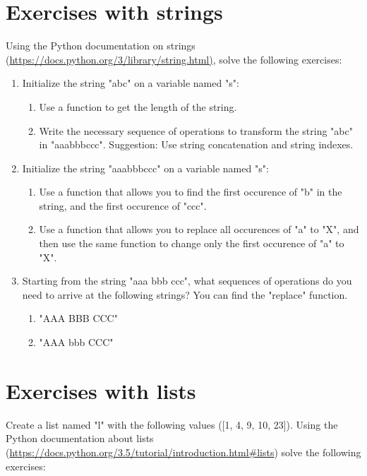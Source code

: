 \section{Exercises with strings}

Using the Python documentation on strings (\url{https://docs.python.org/3/library/string.html)}, solve the following exercises:

\begin{enumerate}

\item Initialize the string "abc" on a variable named "s":
\begin{enumerate}
\item Use a function to get the length of the string.
\item Write the necessary sequence of operations to transform the string "abc" in "aaabbbccc". Suggestion: Use string concatenation and string indexes.
\end{enumerate}

\item Initialize the string "aaabbbccc" on a variable named "s":
\begin{enumerate}
\item Use a function that allows you to find the first occurence of "b" in the string, and the first occurence of "ccc".
\item Use a function that allows you to replace all occurences of "a" to "X", and then use the same function to change only the first occurence of "a" to "X".
\end{enumerate}

\item Starting from the string "aaa bbb ccc", what sequences of operations do you need to arrive at the following strings? You can find the "replace" function.
\begin{enumerate}
\item "AAA BBB CCC"
\item "AAA bbb CCC"
\end{enumerate}

\end{enumerate}

\section{Exercises with lists}

Create a list named "l" with the following values ([1, 4, 9, 10, 23]). Using the Python documentation about lists (\url{https://docs.python.org/3.5/tutorial/introduction.html#lists}) solve the following exercises:

